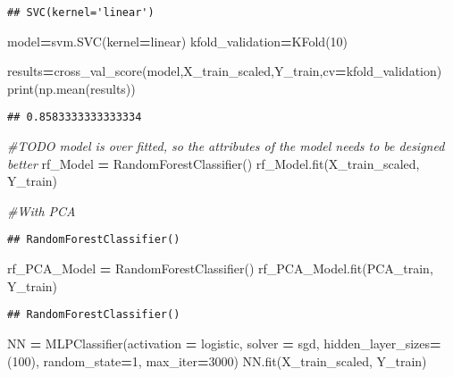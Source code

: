 \documentclass[
]{article}
\newenvironment{Shaded}{\begin{snugshade}}{\end{snugshade}}
\newcommand{\BuiltInTok}[1]{#1}
\newcommand{\CommentTok}[1]{\textcolor[rgb]{0.56,0.35,0.01}{\textit{#1}}}
\newcommand{\DecValTok}[1]{\textcolor[rgb]{0.00,0.00,0.81}{#1}}
\newcommand{\NormalTok}[1]{#1}
\newcommand{\OperatorTok}[1]{\textcolor[rgb]{0.81,0.36,0.00}{\textbf{#1}}}
\newcommand{\StringTok}[1]{\textcolor[rgb]{0.31,0.60,0.02}{#1}}
\begin{document}
\begin{verbatim}
## SVC(kernel='linear')
\end{verbatim}

\begin{Shaded}
\begin{Highlighting}[]
\NormalTok{model}\OperatorTok{=}\NormalTok{svm.SVC(kernel}\OperatorTok{=}\StringTok{\textquotesingle{}linear\textquotesingle{}}\NormalTok{)}
\NormalTok{kfold\_validation}\OperatorTok{=}\NormalTok{KFold(}\DecValTok{10}\NormalTok{)}

\NormalTok{results}\OperatorTok{=}\NormalTok{cross\_val\_score(model,X\_train\_scaled,Y\_train,cv}\OperatorTok{=}\NormalTok{kfold\_validation)}
\BuiltInTok{print}\NormalTok{(np.mean(results))}
\end{Highlighting}
\end{Shaded}

\begin{verbatim}
## 0.8583333333333334
\end{verbatim}

\begin{Shaded}
\begin{Highlighting}[]
\CommentTok{\#TODO model is over fitted, so the attributes of the model needs to be designed better}
\NormalTok{rf\_Model }\OperatorTok{=}\NormalTok{ RandomForestClassifier()}
\NormalTok{rf\_Model.fit(X\_train\_scaled, Y\_train)}


\CommentTok{\#With PCA}
\end{Highlighting}
\end{Shaded}

\begin{verbatim}
## RandomForestClassifier()
\end{verbatim}

\begin{Shaded}
\begin{Highlighting}[]
\NormalTok{rf\_PCA\_Model }\OperatorTok{=}\NormalTok{ RandomForestClassifier()}
\NormalTok{rf\_PCA\_Model.fit(PCA\_train, Y\_train)}
\end{Highlighting}
\end{Shaded}

\begin{verbatim}
## RandomForestClassifier()
\end{verbatim}

\begin{Shaded}
\begin{Highlighting}[]
\NormalTok{NN }\OperatorTok{=}\NormalTok{ MLPClassifier(activation }\OperatorTok{=} \StringTok{\textquotesingle{}logistic\textquotesingle{}}\NormalTok{, solver }\OperatorTok{=} \StringTok{\textquotesingle{}sgd\textquotesingle{}}\NormalTok{, hidden\_layer\_sizes}\OperatorTok{=}\NormalTok{(}\DecValTok{100}\NormalTok{), random\_state}\OperatorTok{=}\DecValTok{1}\NormalTok{, max\_iter}\OperatorTok{=}\DecValTok{3000}\NormalTok{)}
\NormalTok{NN.fit(X\_train\_scaled, Y\_train)}
\end{Highlighting}
\end{Shaded}
\end{document}
